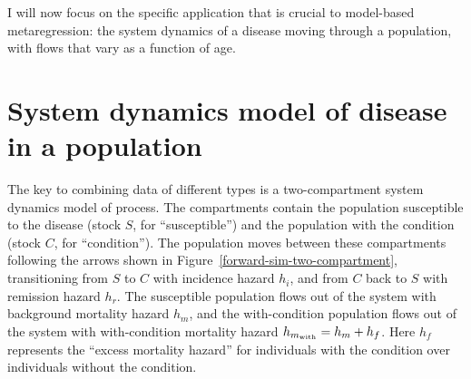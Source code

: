 








I will now focus on the specific application that is crucial to
model-based metaregression: the system dynamics of a disease moving
through a population, with flows that vary as a function of age.

\section{System dynamics model of disease in a population}
\label{sys-dynamics}
The key to combining data of different types is a two-compartment
system dynamics model of process. The compartments contain the
population susceptible to the disease (stock $S$, for ``susceptible'')
and the population with the condition (stock $C$, for
``condition''). The population moves between these compartments
following the arrows shown in
Figure~\ref{forward-sim-two-compartment}, transitioning from $S$ to
$C$ with incidence hazard $h_i$, and from $C$ back to $S$ with
remission hazard $h_r$. The susceptible population flows out of the
system with background mortality hazard $h_m$, and the with-condition
population flows out of the system with with-condition mortality
hazard $h_{m_{\text{with}}} = h_m+h_f$.  Here $h_f$ represents the ``excess
mortality hazard'' for individuals with the condition over individuals
without the condition.

